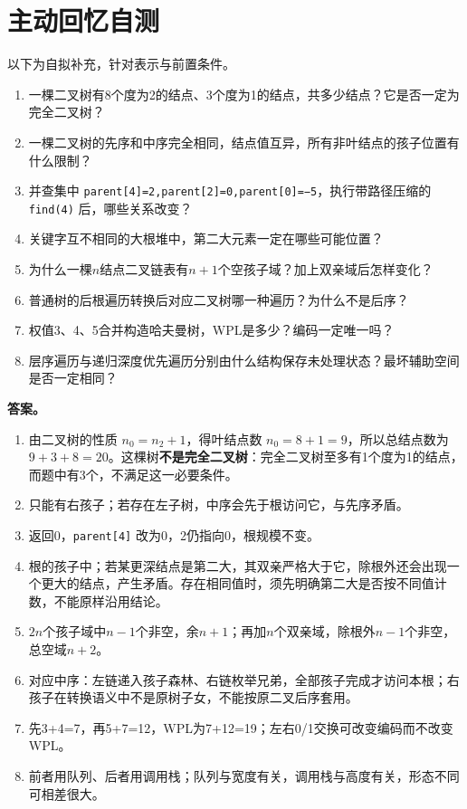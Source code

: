 \section{主动回忆自测}\label{DS05-check}

以下为自拟补充，针对表示与前置条件。

\begin{enumerate}
\def\labelenumi{\arabic{enumi}.}
\item
  一棵二叉树有8个度为2的结点、3个度为1的结点，共多少结点？它是否一定为完全二叉树？
\item
  一棵二叉树的先序和中序完全相同，结点值互异，所有非叶结点的孩子位置有什么限制？
\item
  并查集中 \texttt{parent[\allowbreak{}4]\allowbreak{}=\allowbreak{}2,\allowbreak{}parent[\allowbreak{}2]\allowbreak{}=\allowbreak{}0,\allowbreak{}parent[\allowbreak{}0]\allowbreak{}=\allowbreak{}−5}，执行带路径压缩的 \texttt{find(\allowbreak{}4)\allowbreak{}} 后，哪些关系改变？
\item
  关键字互不相同的大根堆中，第二大元素一定在哪些可能位置？
\item
  为什么一棵\(n\)结点二叉链表有\(n+1\)个空孩子域？加上双亲域后怎样变化？
\item
  普通树的后根遍历转换后对应二叉树哪一种遍历？为什么不是后序？
\item
  权值3、4、5合并构造哈夫曼树，WPL是多少？编码一定唯一吗？
\item
  层序遍历与递归深度优先遍历分别由什么结构保存未处理状态？最坏辅助空间是否一定相同？
\end{enumerate}

\textbf{答案。}

\begin{enumerate}
\def\labelenumi{\arabic{enumi}.}
\item
  由二叉树的性质 \(n_0=n_2+1\)，得叶结点数 \(n_0=8+1=9\)，所以总结点数为 \(9+3+8=20\)。这棵树\textbf{不是完全二叉树}：完全二叉树至多有1个度为1的结点，而题中有3个，不满足这一必要条件。
\item
  只能有右孩子；若存在左子树，中序会先于根访问它，与先序矛盾。
\item
  返回0，\texttt{parent[\allowbreak{}4]\allowbreak{}} 改为0，2仍指向0，根规模不变。
\item
  根的孩子中；若某更深结点是第二大，其双亲严格大于它，除根外还会出现一个更大的结点，产生矛盾。存在相同值时，须先明确第二大是否按不同值计数，不能原样沿用结论。
\item
  \(2n\)个孩子域中\(n-1\)个非空，余\(n+1\)；再加\(n\)个双亲域，除根外\(n-1\)个非空，总空域\(n+2\)。
\item
  对应中序：左链递入孩子森林、右链枚举兄弟，全部孩子完成才访问本根；右孩子在转换语义中不是原树子女，不能按原二叉后序套用。
\item
  先3+4=7，再5+7=12，WPL为7+12=19；左右0/1交换可改变编码而不改变WPL。
\item
  前者用队列、后者用调用栈；队列与宽度有关，调用栈与高度有关，形态不同可相差很大。
\end{enumerate}
